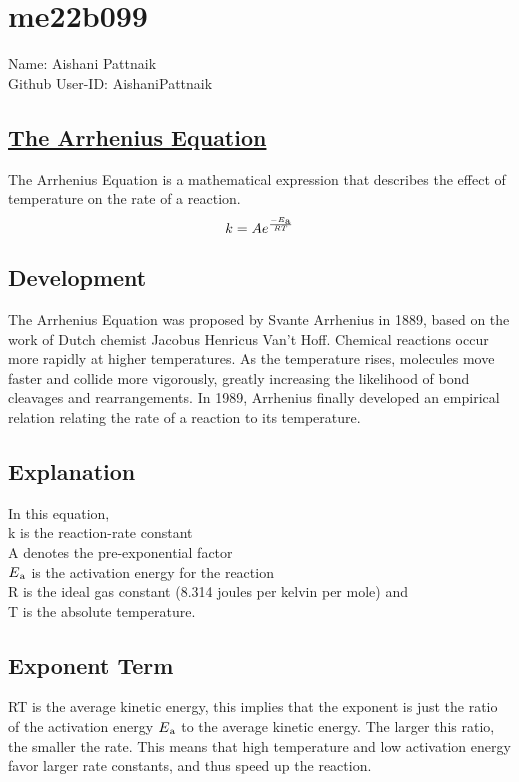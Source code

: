 \section*{me22b099}
Name: Aishani Pattnaik\\
Github User-ID: AishaniPattnaik\\
\subsection*{\underline{The Arrhenius Equation}}
The Arrhenius Equation is a mathematical expression that describes the effect of temperature on the rate of a reaction.
\begin{equation}
k=Ae^{\frac{-E\textsubscript{a}}{RT}}
\end{equation}


\subsection*{Development}
The Arrhenius Equation was proposed by Svante Arrhenius in 1889, based on the work of Dutch chemist Jacobus Henricus Van't Hoff. 
Chemical reactions occur more rapidly at higher temperatures. As the temperature rises, molecules move faster and collide more vigorously, greatly increasing the likelihood of bond cleavages and rearrangements.  
In 1989, Arrhenius finally developed an empirical relation relating the rate of a reaction to its temperature.

\subsection*{Explanation}
In this equation,\\
k is the reaction-rate constant\\
A denotes the pre-exponential factor\\
$E\textsubscript{a}$ is the activation energy for the reaction\\
R is the ideal gas constant (8.314 joules per kelvin per mole) and \\
T is the absolute temperature.

\subsection*{Exponent Term}
RT is the average kinetic energy, this implies that the exponent is just the ratio of the activation energy $E\textsubscript{a}$ to the average kinetic energy. The larger this ratio, the smaller the rate. This means that high temperature and low activation energy favor larger rate constants, and thus speed up the reaction.

